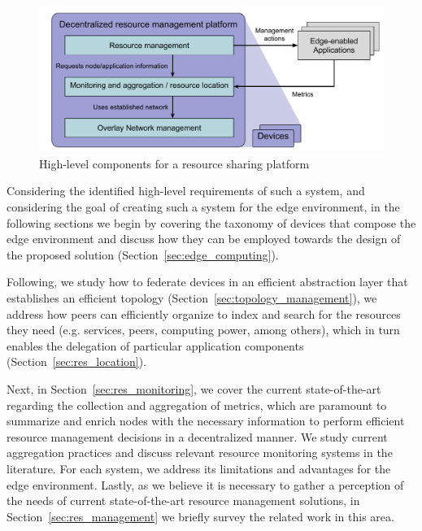 \begin{figure}
    \centering
    \includegraphics[width=0.8\linewidth]{Chapters/Figures/Resource management- generic arch.pdf}
    \caption{High-level components for a resource sharing platform}
    \label{fig:proposed_architecture}
\end{figure}


Considering the identified high-level requirements of such a system, and considering the goal of creating such a system for the edge environment, in the following sections we begin by covering the taxonomy of devices that compose the edge environment and discuss how they can be employed towards the design of the proposed solution (Section~\ref{sec:edge_computing}). 

Following, we study how to federate devices in an efficient abstraction layer that establishes an efficient topology (Section~\ref{sec:topology_management}), we address how peers can efficiently organize to index and search for the resources they need (e.g. services, peers, computing power, among others), which in turn enables the delegation of particular application components (Section~\ref{sec:res_location}). 


Next, in Section~\ref{sec:res_monitoring}, we cover the current state-of-the-art regarding the collection and aggregation of metrics, which are paramount to summarize and enrich nodes with the necessary information to perform efficient resource management decisions in a decentralized manner. We study current aggregation practices and discuss relevant resource monitoring systems in the literature. For each system, we address its limitations and advantages for the edge environment. Lastly, as we believe it is necessary to gather a perception of the needs of current state-of-the-art resource management solutions, in Section~\ref{sec:res_management} we briefly survey the related work in this area.

